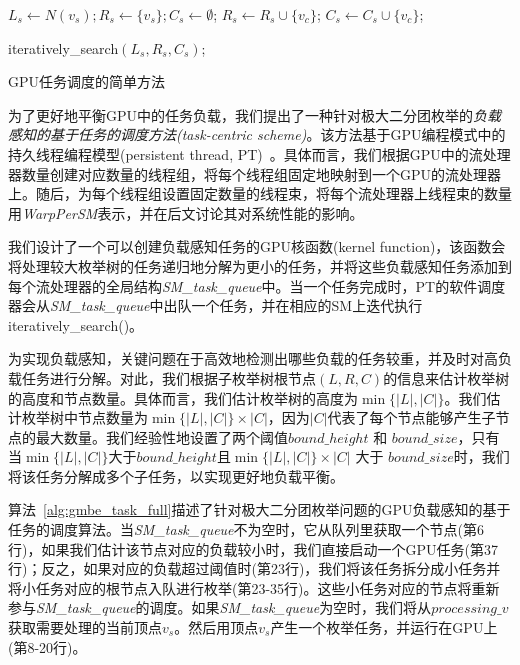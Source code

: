 \begin{algorithm} [H]
  \begin{algorithmic}[1]
    \normalsize
    
      \STATE $L_s \leftarrow N(v_s); R_s\leftarrow\{v_s\}; C_s\leftarrow \emptyset $;
          \STATE $R_s \leftarrow R_s \cup \{v_c\}$;
          \STATE $C_s \leftarrow C_s \cup \{v_c\}$;
        \ENDIF 
      \ENDFOR

        \STATE \textsf{iteratively\_search}$(L_s,R_s,C_s)$;
      \ENDIF

    \ENDFOR

  \end{algorithmic}
  \caption{GPU任务调度的简单方法}
  \label{alg:gmbe_task_naive}
\end{algorithm}



为了更好地平衡GPU中的任务负载，我们提出了一种针对极大二分团枚举的\textit{负载感知的基于任务的调度方法(task-centric scheme)}。该方法基于GPU编程模式中的持久线程编程模型(persistent thread, PT)~\cite{PersistentThread12}。具体而言，我们根据GPU中的流处理器数量创建对应数量的线程组，将每个线程组固定地映射到一个GPU的流处理器上。随后，为每个线程组设置固定数量的线程束，将每个流处理器上线程束的数量用\textit{WarpPerSM}表示，并在后文讨论其对系统性能的影响。



我们设计了一个可以创建负载感知任务的GPU核函数(kernel function)，该函数会将处理较大枚举树的任务递归地分解为更小的任务，并将这些负载感知任务添加到每个流处理器的全局结构\textit{SM\_task\_queue}中。当一个任务完成时，PT的软件调度器会从\textit{SM\_task\_queue}中出队一个任务，并在相应的SM上迭代执行\textsf{}{iteratively\_search()}。

为实现负载感知，关键问题在于高效地检测出哪些负载的任务较重，并及时对高负载任务进行分解。对此，我们根据子枚举树根节点$(L,R,C)$的信息来估计枚举树的高度和节点数量。具体而言，我们估计枚举树的高度为$\min\{|L|,|C|\}$。我们估计枚举树中节点数量为$\min\{|L|,|C|\}\times|C|$，因为$|C|$代表了每个节点能够产生子节点的最大数量。我们经验性地设置了两个阈值$bound\_height$ 和 $bound\_size$，只有当$\min\{|L|,|C|\}$大于$bound\_height$且$\min\{|L|,|C|\}\times|C|$ 大于 $bound\_size$时，我们将该任务分解成多个子任务，以实现更好地负载平衡。



算法~\ref{alg:gmbe_task_full}描述了针对极大二分团枚举问题的GPU负载感知的基于任务的调度算法。当\textit{SM\_task\_queue}不为空时，它从队列里获取一个节点(第6行)，如果我们估计该节点对应的负载较小时，我们直接启动一个GPU任务(第37行)；反之，如果对应的负载超过阈值时(第23行)，我们将该任务拆分成小任务并将小任务对应的根节点入队进行枚举(第23-35行)。这些小任务对应的节点将重新参与\textit{SM\_task\_queue}的调度。如果\textit{SM\_task\_queue}为空时，我们将从$processing\_v$获取需要处理的当前顶点$v_s$。然后用顶点$v_s$产生一个枚举任务，并运行在GPU上(第8-20行)。

